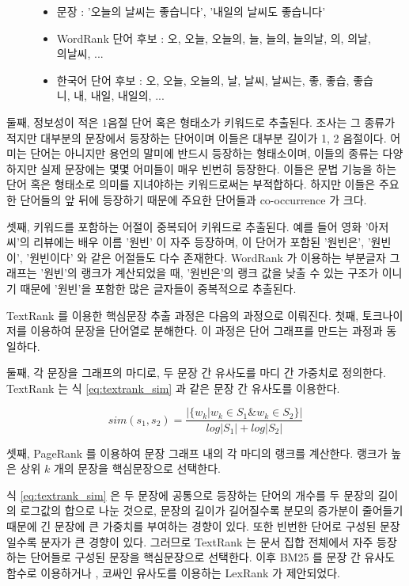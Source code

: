 \documentclass[11pt]{article}
\begin{document}
\begin{figure}
\label{fig:krwordrank_candidates}
\begin{itemize}[noitemsep]
  \item 문장 : '오늘의 날씨는 좋습니다', '내일의 날씨도 좋습니다'
  \item WordRank 단어 후보 : 오, 오늘, 오늘의, 늘, 늘의, 늘의날, 의, 의날, 의날씨, ...
  \item 한국어 단어 후보 : 오, 오늘, 오늘의, 날, 날씨, 날씨는, 좋, 좋습, 좋습니, 내, 내일, 내일의, ...
\end{itemize}
\end{figure}

둘째, 정보성이 적은 1음절 단어 혹은 형태소가 키워드로 추출된다.
조사는 그 종류가 적지만 대부분의 문장에서 등장하는 단어이며 이들은 대부분 길이가 1, 2 음절이다.
어미는 단어는 아니지만 용언의 말미에 반드시 등장하는 형태소이며, 이들의 종류는 다양하지만 실제 문장에는 몇몇 어미들이 매우 빈번히 등장한다.
이들은 문법 기능을 하는 단어 혹은 형태소로 의미를 지녀야하는 키워드로써는 부적합하다.
하지만 이들은 주요한 단어들의 앞 뒤에 등장하기 때문에 주요한 단어들과 co-occurrence 가 크다.

셋째, 키워드를 포함하는 어절이 중복되어 키워드로 추출된다.
예를 들어 영화 '아저씨'의 리뷰에는 배우 이름 '원빈' 이 자주 등장하며, 이 단어가 포함된 '원빈은', '원빈이', '원빈이다' 와 같은 어절들도 다수 존재한다.
WordRank 가 이용하는 부분글자 그래프는 '원빈'의 랭크가 계산되었을 때, '원빈은'의 랭크 값을 낮출 수 있는 구조가 이니기 때문에 '원빈'을 포함한 많은 글자들이 중복적으로 추출된다.

TextRank 를 이용한 핵심문장 추출 과정은 다음의 과정으로 이뤄진다.
첫째, 토크나이저를 이용하여 문장을 단어열로 분해한다.
이 과정은 단어 그래프를 만드는 과정과 동일하다.

둘째, 각 문장을 그래프의 마디로, 두 문장 간 유사도를 마디 간 가중치로 정의한다.
TextRank 는 식 \ref{eq:textrank_sim} 과 같은 문장 간 유사도를 이용한다.

\begin{equation}
\label{eq:textrank_sim}
sim(s_1, s_2) = \frac{\vert \{ w_k \vert w_k \in S_1 \& w_k \in S_2 \} \vert}{log \vert S_1 \vert + log \vert S_2 \vert}
\end{equation}

셋째, PageRank \citep{ilprints422} 를 이용하여 문장 그래프 내의 각 마디의 랭크를 계산한다.
랭크가 높은 상위 $k$ 개의 문장을 핵심문장으로 선택한다.

식 \ref{eq:textrank_sim} 은 두 문장에 공통으로 등장하는 단어의 개수를 두 문장의 길이의 로그값의 합으로 나눈 것으로, 문장의 길이가 길어질수록 분모의 증가분이 줄어들기 때문에 긴 문장에 큰 가중치를 부여하는 경향이 있다.
또한 빈번한 단어로 구성된 문장일수록 분자가 큰 경향이 있다.
그러므로 TextRank 는 문서 집합 전체에서 자주 등장하는 단어들로 구성된 문장을 핵심문장으로 선택한다.
이후 BM25 \citep{robertson2009probabilistic} 를 문장 간 유사도 함수로 이용하거나 \citep{barrios2016variations}, 코싸인 유사도를 이용하는 LexRank \citep{erkan2004lexrank} 가 제안되었다.
\end{document}
